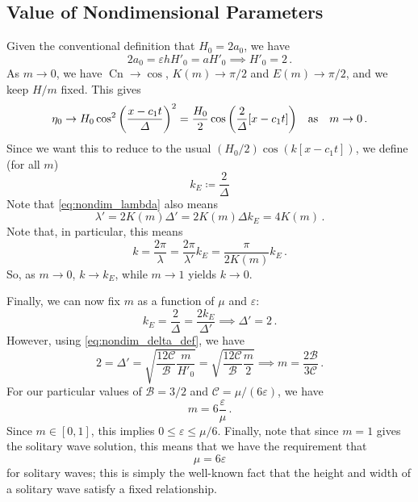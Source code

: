 \documentclass{jfm}
\let\Oldsubsection\subsection
\renewcommand{\subsection}{\FloatBarrier\Oldsubsection}
\DeclareMathOperator{\cn}{Cn}
\renewcommand*{\epsilon}{\varepsilon}
\begin{document}
\subsection{Value of Nondimensional Parameters}
Given the conventional definition that $H_0 = 2 a_0$, we have
\begin{equation}
  2 a_0 = \epsilon h H'_0 = a H'_0 \implies H'_0 = 2 \,.
\end{equation}
As $m \to 0$, we have $\cn \to \cos$, $K(m) \to \pi/2$ and $E(m) \to
\pi/2$, and we keep $H/m$ fixed.
This gives
\begin{equation}
  \eta_0 \to H_0 \cos^2 \pqty{\frac{x-c_1 t}{\Delta}}^2
  = \frac{H_0}{2} \cos \pqty{\frac{2}{\Delta} \bqty{x-c_1 t}}
  \qq{as} m \to 0 \,.
\end{equation}
Since we want this to reduce to the usual $(H_0/2) \cos(k[x-c_1 t])$, we
define (for all $m$)
\begin{equation}
  k_E \coloneqq \frac{2}{\Delta}
\end{equation}
Note that \cref{eq:nondim_lambda} also means
\begin{equation}
  \lambda' = 2 K(m) \Delta' = 2 K(m) \Delta k_E = 4 K(m) \,.
\end{equation}
Note that, in particular, this means
\begin{equation}
  k = \frac{2 \pi}{\lambda} = \frac{2 \pi}{\lambda'} k_E
  = \frac{\pi}{2 K(m)} k_E \,.
\end{equation}
So, as $m \to 0$, $k \to k_E$, while $m \to 1$ yields $k \to 0$.

Finally, we can now fix $m$ as a function of $\mu$ and $\epsilon$:
\begin{equation}
  k_E = \frac{2}{\Delta} = \frac{2 k_E}{\Delta'}
  \implies \Delta' = 2 \,.
\end{equation}
However, using \cref{eq:nondim_delta_def}, we have
\begin{equation}
  2 = \Delta ' = \sqrt{\frac{12 \mathcal{C}}{\mathcal{B}}
    \frac{m}{H'_0}}
  = \sqrt{\frac{12 \mathcal{C}}{\mathcal{B}} \frac{m}{2}}
  \implies m = \frac{2 \mathcal{B}}{3 \mathcal{C}} \,.
\end{equation}
For our particular values of $\mathcal{B} = 3/2$ and $\mathcal{C} =
\mu/(6 \epsilon)$, we have
\begin{equation}
  m = 6 \frac{\epsilon}{\mu} \,.
\end{equation}
Since $m \in [0,1]$, this implies $0 \le \epsilon \le \mu/6$.
Finally, note that since $m = 1$ gives the solitary wave solution, this
means that we have the requirement that
\begin{equation}
  \mu = 6 \epsilon
\end{equation}
for solitary waves; this is simply the well-known fact that the height
and width of a solitary wave satisfy a fixed relationship.
\end{document}
